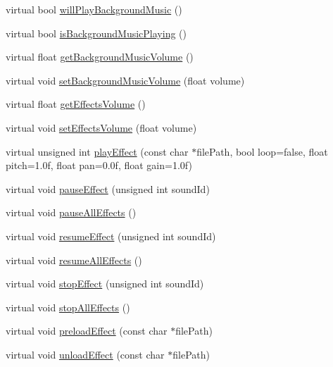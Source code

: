 \begin{DoxyCompactItemize}
\item 
virtual bool \hyperlink{classCocosDenshion_1_1SimpleAudioEngine_ad9bf3fc744d4421c24d2e33832ba929f}{will\+Play\+Background\+Music} ()
\item 
virtual bool \hyperlink{classCocosDenshion_1_1SimpleAudioEngine_a0fd9c2b74e6b71df1c2ec64b95ba6549}{is\+Background\+Music\+Playing} ()
\item 
virtual float \hyperlink{classCocosDenshion_1_1SimpleAudioEngine_ae9caf4160ddc26d281a9f737b5c90e1b}{get\+Background\+Music\+Volume} ()
\item 
virtual void \hyperlink{classCocosDenshion_1_1SimpleAudioEngine_a8cd08dcf004fc9d0f4f65baebd0d820f}{set\+Background\+Music\+Volume} (float volume)
\item 
virtual float \hyperlink{classCocosDenshion_1_1SimpleAudioEngine_a6bd483609e96ee35f1ebf55b56be7770}{get\+Effects\+Volume} ()
\item 
virtual void \hyperlink{classCocosDenshion_1_1SimpleAudioEngine_ac7df34b62f2e2c822d4eb480669feea5}{set\+Effects\+Volume} (float volume)
\item 
virtual unsigned int \hyperlink{classCocosDenshion_1_1SimpleAudioEngine_af6e693203915f14606aa7ef19c0a166a}{play\+Effect} (const char $\ast$file\+Path, bool loop=false, float pitch=1.\+0f, float pan=0.\+0f, float gain=1.\+0f)
\item 
virtual void \hyperlink{classCocosDenshion_1_1SimpleAudioEngine_a112e442e3a4dcc8e2018a516bf214e3c}{pause\+Effect} (unsigned int sound\+Id)
\item 
virtual void \hyperlink{classCocosDenshion_1_1SimpleAudioEngine_a7533eda959dd0aec19d17daeb08e4635}{pause\+All\+Effects} ()
\item 
virtual void \hyperlink{classCocosDenshion_1_1SimpleAudioEngine_a51fe336239471376ed6d5ed35dc2396e}{resume\+Effect} (unsigned int sound\+Id)
\item 
virtual void \hyperlink{classCocosDenshion_1_1SimpleAudioEngine_ac268369a7565a32649c20adc69e8401c}{resume\+All\+Effects} ()
\item 
virtual void \hyperlink{classCocosDenshion_1_1SimpleAudioEngine_a1059fb2535cf1decec6b8889f3692c2b}{stop\+Effect} (unsigned int sound\+Id)
\item 
virtual void \hyperlink{classCocosDenshion_1_1SimpleAudioEngine_a59d96cc7856375142ac44f5b729eadb3}{stop\+All\+Effects} ()
\item 
virtual void \hyperlink{classCocosDenshion_1_1SimpleAudioEngine_a94bdde9ae877664da2dd9e7e023f3e68}{preload\+Effect} (const char $\ast$file\+Path)
\item 
virtual void \hyperlink{classCocosDenshion_1_1SimpleAudioEngine_a4af33efd9b00e232a5ef18ccefdbcda0}{unload\+Effect} (const char $\ast$file\+Path)
\end{DoxyCompactItemize}
